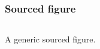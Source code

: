 \begin{frame}
    \frametitle{Sourced figure}


    \begin{columns}
        \begin{column}{0.7\textwidth}

            A generic sourced figure.

        \end{column}
        \begin{column}{0.3\textwidth}


        \end{column}
    \end{columns}


\end{frame}



